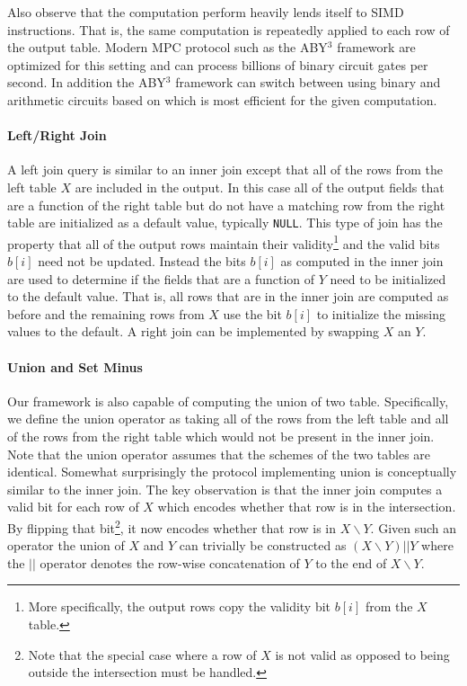 Also observe that the computation perform heavily lends itself to SIMD instructions. That is, the same computation is repeatedly applied to each row of the output table. Modern MPC protocol such as the ABY$^3$ framework \cite{aby3,highthroughput} are optimized for this setting and can process billions of binary circuit gates per second\cite{highthroughput}. In addition the ABY$^3$ framework can switch between using binary and arithmetic circuits based on which is most efficient for the given computation. 

\paragraph{Left/Right Join}

A left join query is similar to an inner join except that all of the rows from the left table $X$ are included in the output. In this case all of the output fields that are a function of the right table but do not have a matching row from the right table are initialized as a default value, typically \texttt{NULL}.  This type of join has the property that all of the output rows maintain their validity\footnote{More specifically, the output rows copy the validity bit $b[i]$ from the $X$ table.} and the valid bits $b[i]$ need not be updated. Instead the bits $b[i]$ as computed in the inner join are used to determine if the fields that are a function of $Y$ need to be initialized to the default value. That is, all rows that are in the inner join are computed as before and the remaining rows from $X$ use the bit $b[i]$ to initialize the missing values to the default. A right join can be implemented by swapping $X$ an $Y$.

\paragraph{Union and Set Minus}

Our framework is also capable of computing the union of two table. Specifically, we define the union operator as taking all of the rows from the left table and all of the rows from the right table which would not be present in the inner join. Note that the union operator assumes that the schemes of the two tables are identical. Somewhat surprisingly the protocol implementing union is conceptually similar to the inner join. The key observation is that the inner join computes a valid bit for each row of $X$ which encodes whether that row is in the intersection. By flipping that bit\footnote{Note that the special case where a row of $X$ is not valid as opposed to being outside the intersection must be handled.}, it now encodes whether that row is in $X\backslash Y$. Given such an operator the union of $X$ and $Y$ can trivially be constructed as $(X\backslash Y) || Y$ where the $||$ operator denotes the row-wise concatenation of $Y$ to the end of $X\backslash Y$.


